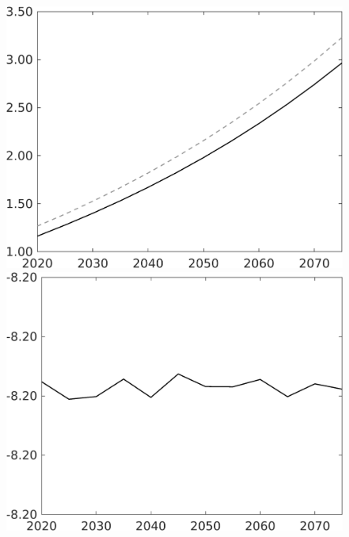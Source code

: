 \documentclass[12pt]{article}
\begin{document}
\begin{figure}[h!!]
\begin{minipage}[]{0.32\textwidth}
	\end{minipage}	
	\begin{minipage}[]{0.32\textwidth}
		\includegraphics[width=1\textwidth]{../../codding_model/own_basedOnFried/optimalPol_010922_revision/figures/all_13Sept22/CompTaul_Equlab_LFBAU_Reg0_C_spillover0_nsk1_xgr0_knspil0_sep1_countec0_GovRev0_etaa0.79_lgd0.png}
	\end{minipage}	
	\begin{minipage}[]{0.32\textwidth}
		\includegraphics[width=1\textwidth]{../../codding_model/own_basedOnFried/optimalPol_010922_revision/figures/all_13Sept22/CompTaul_Equlab_LFBAUPer_Reg0_F_spillover0_nsk1_xgr0_knspil0_sep1_countec0_GovRev0_etaa0.79.png}

\end{minipage}
\end{figure}
\end{document}
